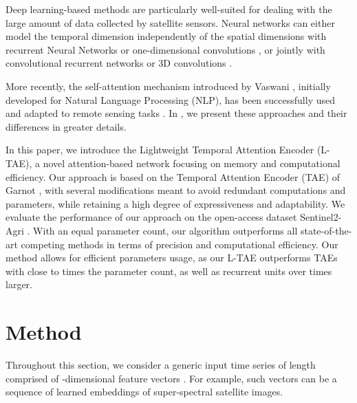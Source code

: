 \documentclass[runningheads]{llncs}
\begin{document}
Deep learning-based methods are particularly well-suited for dealing with the large amount of data collected by satellite sensors. Neural networks can either model the temporal dimension independently of the spatial dimensions with recurrent Neural Networks \cite{garnot2019time} or one-dimensional convolutions \cite{pelletier2019temporal}, or jointly with convolutional recurrent networks \cite{russwurm2018convolutional} or 3D convolutions \cite{ji20183d}.

More recently, the self-attention mechanism introduced by Vaswani \etal \cite{vaswani2017attention}, initially developed for Natural Language Processing (NLP), has been successfully used and adapted to remote sensing tasks \cite{russwurm2019self,garnot2019satellite}. In , we present these approaches and their differences in greater details.

 In this paper, we introduce the Lightweight Temporal Attention Encoder (L-TAE), a novel attention-based network focusing on memory and computational efficiency. Our approach is based on the Temporal Attention Encoder (TAE) of Garnot \etal \cite{garnot2019satellite}, with several modifications meant to avoid redundant computations and parameters, while retaining a high degree of expressiveness and adaptability.
We evaluate the performance of our approach on the open-access dataset Sentinel2-Agri \cite{garnot2019satellite}. With an equal parameter count, our algorithm outperforms all state-of-the-art competing methods in terms of precision and computational efficiency. Our method allows for efficient parameters usage, as our L-TAE outperforms TAEs with close to  times the parameter count, as well as recurrent units over  times larger.
 \section{Method}
Throughout this section, we consider a generic input time series of length  comprised of -dimensional feature vectors . For example, such vectors can be a sequence of learned embeddings of super-spectral satellite images. 
\end{document}
